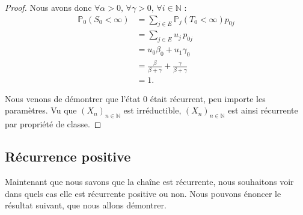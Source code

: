 \documentclass[12pt,a4paper]{report}
\theoremstyle{remark}
\begin{document}
\begin{proof}
Nous avons donc $\forall \alpha > 0, \, \forall \gamma > 0, \, \forall i \in \mathbb{N}$ :
\begin{align*}
\mathbb{P}_0(S_0 < \infty) &= \sum_{j\in E}{\mathbb{P}_j(T_0 < \infty)p_{0j}} \\
&= \sum_{j\in E}u_j \, {p_{0j}} \\
&= u_0 \beta_0 + u_1 \gamma_0 \\
&= \frac{\beta}{\beta + \gamma} + \frac{\gamma}{\beta + \gamma} \\
&= 1.
\end{align*}

Nous venons de démontrer que l'état $0$ était récurrent, peu importe les paramètres. Vu que $(X_n)_{n \in \mathbb{N}}$ est irréductible, $(X_n)_{n \in \mathbb{N}}$ est ainsi récurrente par propriété de classe.
\end{proof}

\subsection{Récurrence positive}
\vspace{0.6cm}

Maintenant que nous savons que la chaîne est récurrente, nous souhaitons voir dans quels cas elle est récurrente positive ou non. Nous pouvons énoncer le résultat suivant, que nous allons démontrer.
\end{document}
